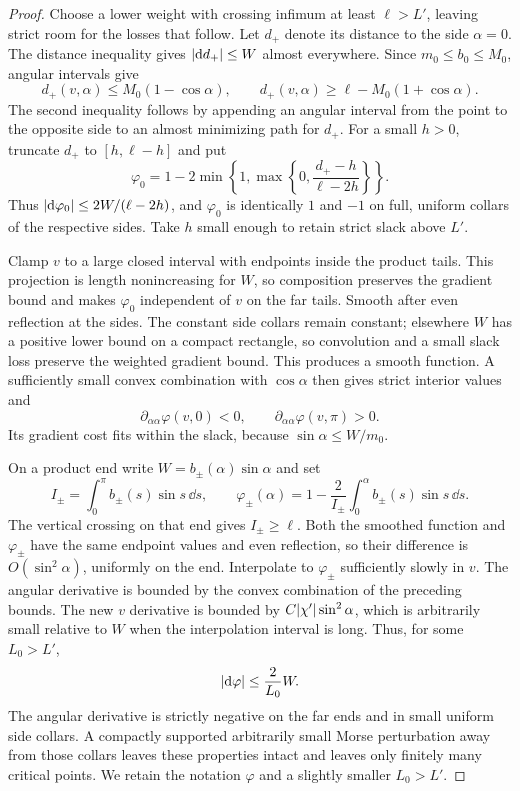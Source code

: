 \begin{proof}
Choose a lower weight with crossing infimum at least $\ell>L'$, leaving
strict room for the losses that follow.  Let $d_+$ denote its distance to
the side $\alpha=0$.  The distance inequality gives
$\lvert\mathrm d d_+\rvert\le W$ almost everywhere.  Since
$m_0\le b_0\le M_0$, angular intervals give
\[
 d_+(v,\alpha)\le M_0(1-\cos\alpha),\qquad
 d_+(v,\alpha)\ge\ell-M_0(1+\cos\alpha).
\]
The second inequality follows by appending an angular interval from the
point to the opposite side to an almost minimizing path for $d_+$.
For a small $h>0$, truncate $d_+$ to $[h,\ell-h]$ and put
\[
 \varphi_0
 =1-2\min\left\{1,\max\left\{0,
                  \frac{d_+-h}{\ell-2h}\right\}\right\}.
\]
Thus $\lvert\mathrm d\varphi_0\rvert\le2W/(\ell-2h)$, and $\varphi_0$ is identically
$1$ and $-1$ on full, uniform collars of the respective sides.  Take $h$
small enough to retain strict slack above $L'$.

Clamp $v$ to a large closed interval with endpoints inside the product
tails.  This projection is length nonincreasing for $W$, so composition
preserves the gradient bound and makes $\varphi_0$ independent of $v$
on the far tails.  Smooth after even reflection at the sides.  The
constant side collars remain constant; elsewhere $W$ has a positive
lower bound on a compact rectangle, so convolution and a small slack
loss preserve the weighted gradient bound.  This produces a smooth
function.  A sufficiently small convex combination with $\cos\alpha$
then gives strict interior values and
\[
 \partial_{\alpha\alpha}\varphi(v,0)<0,
 \qquad \partial_{\alpha\alpha}\varphi(v,\pi)>0.
\]
Its gradient cost fits within the slack, because
$\sin\alpha\le W/m_0$.

On a product end write $W=b_\pm(\alpha)\sin\alpha$ and set
\[
 I_\pm=\int_0^\pi b_\pm(s)\sin s\,\dd s,
 \qquad
 \varphi_\pm(\alpha)
 =1-\frac{2}{I_\pm}\int_0^\alpha b_\pm(s)\sin s\,\dd s.
\]
The vertical crossing on that end gives $I_\pm\ge\ell$.
Both the smoothed function and $\varphi_\pm$ have the same endpoint
values and even reflection, so their difference is $O(\sin^2\alpha)$,
uniformly on the end.  Interpolate to $\varphi_\pm$ sufficiently slowly
in $v$.  The angular derivative is bounded by the convex combination
of the preceding bounds.  The new $v$ derivative is bounded by
$C\lvert\chi'\rvert\sin^2\alpha$, which is arbitrarily small relative to $W$
when the interpolation interval is long.  Thus, for some $L_0>L'$,
\begin{equation}\label{c:initial-calibration}
 \lvert\mathrm d\varphi\rvert\le\frac{2}{L_0}W.
\end{equation}
The angular derivative is strictly negative on the far ends and in
small uniform side collars.  A compactly supported arbitrarily small
Morse perturbation away from those collars leaves these properties
intact and leaves only finitely many critical points.  We retain the
notation $\varphi$ and a slightly smaller $L_0>L'$.


\end{proof}
